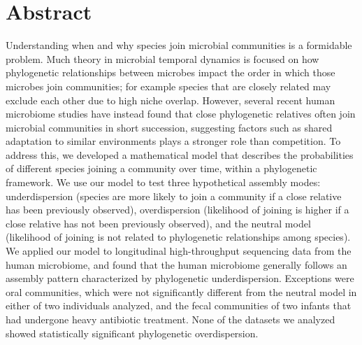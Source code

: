 \documentclass{article}
\begin{document}
\newpage


{\parindent0pt \section{Abstract}}
Understanding when and why species join microbial communities is a formidable problem. Much theory in microbial temporal dynamics is focused on how phylogenetic relationships between microbes impact the order in which those microbes join communities; for example species that are closely related may exclude each other due to high niche overlap. However, several recent human microbiome studies have instead found that close phylogenetic relatives often join microbial communities in short succession, suggesting factors such as shared adaptation to similar environments plays a stronger role than competition. To address this, we developed a mathematical model that describes the probabilities of different species joining a community over time, within a phylogenetic framework. We use our model to test three hypothetical assembly modes: underdispersion (species are more likely to join a community if a close relative has been previously observed), overdispersion (likelihood of joining is higher if a close relative has not been previously observed), and the neutral model (likelihood of joining is not related to phylogenetic relationships among species). We applied our model to longitudinal high-throughput sequencing data from the human microbiome, and found that the human microbiome generally follows an assembly pattern characterized by phylogenetic underdispersion. Exceptions were oral communities, which were not significantly different from the neutral model in either of two individuals analyzed, and the fecal communities of two infants that had undergone heavy antibiotic treatment. None of the datasets we analyzed showed statistically significant phylogenetic overdispersion.
\\\par
\end{document}
